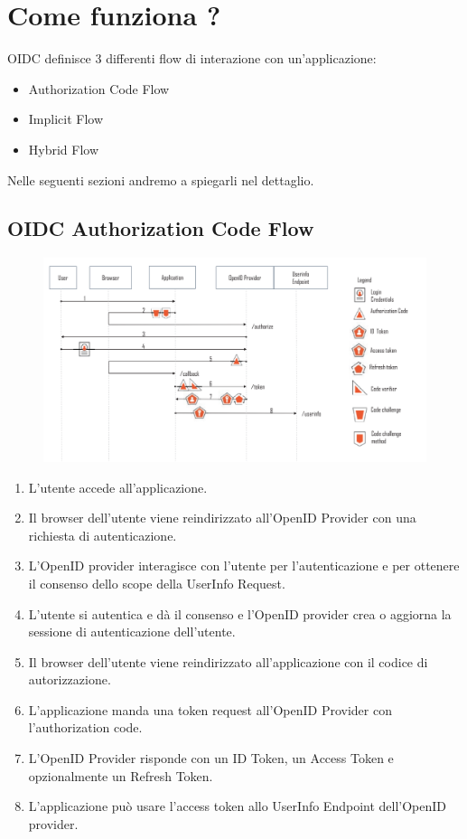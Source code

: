 \section{Come funziona ?}

OIDC definisce 3 differenti flow di interazione con un'applicazione:

\begin{itemize}
    \item Authorization Code Flow
    \item Implicit Flow
    \item Hybrid Flow
\end{itemize}

Nelle seguenti sezioni andremo a spiegarli nel dettaglio.

\subsection{OIDC Authorization Code Flow}

\begin{figure}[H]
    \centering
    \includegraphics[width=\textwidth, keepaspectratio]{capitoli/id_managing/imgs/codeflow.png}
\end{figure}

\begin{enumerate}
    \item L'utente accede all'applicazione.
    \item Il browser dell'utente viene reindirizzato all'OpenID Provider con una
          richiesta di autenticazione.
    \item L'OpenID provider interagisce con l'utente per l'autenticazione e per
          ottenere il consenso dello scope della UserInfo Request.
    \item L'utente si autentica e dà il consenso e l'OpenID provider crea o aggiorna
          la sessione di autenticazione dell'utente.
    \item  Il browser dell'utente viene reindirizzato all'applicazione con il codice
          di autorizzazione.
    \item L'applicazione manda una token request all'OpenID Provider con
          l'authorization code.
    \item L'OpenID Provider risponde con un ID Token, un Access Token e opzionalmente
          un Refresh Token.
    \item L'applicazione può usare l'access token allo UserInfo Endpoint dell'OpenID
          provider.
\end{enumerate}

